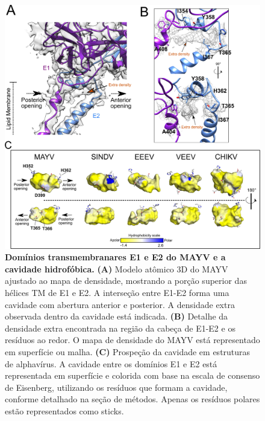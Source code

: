 \documentclass[Portugues]{phdquali}
\begin{document}
\begin{figure}[t]
  \centerline{\includegraphics[scale=0.2]{images/mayv-e1-e2-analysis.png}}
  \caption[Domínios transmembranares E1 e E2 do MAYV e a cavidade hidrofóbica]{\textbf{Domínios transmembranares E1 e E2 do MAYV e a cavidade hidrofóbica.} \textbf{(A)} Modelo atômico 3D do MAYV ajustado ao mapa de densidade, mostrando a porção superior das hélices TM de E1 e E2. A interseção entre E1-E2 forma uma cavidade com abertura anterior e posterior. A densidade extra observada dentro da cavidade está indicada. \textbf{(B)} Detalhe da densidade extra encontrada na região da cabeça de E1-E2 e os resíduos ao redor. O mapa de densidade do MAYV está representado em superfície ou malha. \textbf{(C)} Prospeção da cavidade em estruturas de alphavírus. A cavidade entre os domínios E1 e E2 está representada em superfície e colorida com base na escala de consenso de Eisenberg, utilizando os resíduos que formam a cavidade, conforme detalhado na seção de métodos. Apenas os resíduos polares estão representados como sticks.}
  \label{fig:mayv-e1-e2-analysis}
\end{figure}
\end{document}
